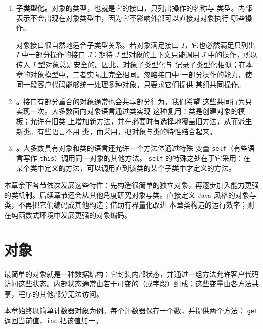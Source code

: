 \begin{enumerate}
  抽象数据类型也提供相似的封装：值的具体表示只在某个作用域——例如模块或
  ADT 定义——内可见，作用域之外的代码只能调用该作用域内定义的操作来处理
  这些值。

\item \textbf{子类型化。}对象的类型，也就是它的接口，只列出操作的名称与
  类型。内部表示不会出现在对象类型中，因为它不影响外部可以直接对对象执行
  哪些操作。

  对象接口很自然地适合子类型关系。若对象满足接口 \(I\)，它也必然满足只列出
  \(I\) 中一部分操作的接口 \(J\)：期待 \(J\) 型对象的上下文只能调用
  \(J\) 中的操作，所以传入 \(I\) 型对象总是安全的。因此，对象子类型化与
  记录子类型化相似；在本章的对象模型中，二者实际上完全相同。忽略接口中
  一部分操作的能力，使同一段客户代码能够统一处理多种对象，只要求它们提供
  某组共同操作。

\item \textbf{。}接口有部分重合的对象通常也会共享部分行为，我们希望
  这些共同行为只实现一次。大多数面向对象语言通过类实现
  这种复用：类是创建对象的模板；允许在旧类
  上增加新方法，并在必要时有选择地覆盖旧方法，从而派生新类。有些语言不用
  类，而采用，把对象与类的特性结合起来。

\item \textbf{。}大多数具有对象和类的语言还允许一个方法体通过特殊
  变量 \texttt{self}（有些语言写作 \texttt{this}）调用同一对象的其他方法。
  \texttt{self} 的特殊之处在于它采用：在
  某个类中定义的方法，可以调用直到该类的某个子类中才定义的方法。
\end{enumerate}

本章余下各节依次发展这些特性：先构造很简单的独立对象，再逐步加入能力更强
的类机制。后续章节还会从其他角度研究对象与类。直接定义 Java
风格的对象与类，不再把它们编码成其他构造；借助有界量化改进
本章类构造的运行效率；则在纯函数式环境中发展更强的对象编码。

\section{对象}
\label{sec:18.2}

最简单的对象就是一种数据结构：它封装内部状态，并通过一组方法允许客户代码
访问这些状态。内部状态通常由若干可变的（或字段）组成；这些变量由各方法共享，程序的其他部分无法访问。

本章始终以简单计数器对象为例。每个计数器保存一个数，并提供两个方法：
\texttt{get} 返回当前值，\texttt{inc} 把该值加一。

